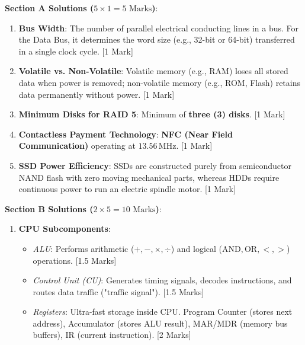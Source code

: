 \begin{solutionbox}
\noindent\textbf{Section A Solutions ($5 \times 1 = 5\text{ Marks}$)}:
\begin{enumerate}
    \item \textbf{Bus Width}: The number of parallel electrical conducting lines in a bus. For the Data Bus, it determines the word size (e.g., 32-bit or 64-bit) transferred in a single clock cycle. [1 Mark]
    \item \textbf{Volatile vs. Non-Volatile}: Volatile memory (e.g., RAM) loses all stored data when power is removed; non-volatile memory (e.g., ROM, Flash) retains data permanently without power. [1 Mark]
    \item \textbf{Minimum Disks for RAID 5}: Minimum of \textbf{three (3) disks}. [1 Mark]
    \item \textbf{Contactless Payment Technology}: \textbf{NFC (Near Field Communication)} operating at $13.56\,\text{MHz}$. [1 Mark]
    \item \textbf{SSD Power Efficiency}: SSDs are constructed purely from semiconductor NAND flash with zero moving mechanical parts, whereas HDDs require continuous power to run an electric spindle motor. [1 Mark]
\end{enumerate}

\medskip
\noindent\textbf{Section B Solutions ($2 \times 5 = 10\text{ Marks}$)}:
\begin{enumerate}[start=6]
    \item \textbf{CPU Subcomponents}:
    \begin{itemize}
        \item \textit{ALU}: Performs arithmetic ($+, -, \times, \div$) and logical ($\text{AND}, \text{OR}, <, >$) operations. [1.5 Marks]
        \item \textit{Control Unit (CU)}: Generates timing signals, decodes instructions, and routes data traffic ("traffic signal"). [1.5 Marks]
        \item \textit{Registers}: Ultra-fast storage inside CPU. Program Counter (stores next address), Accumulator (stores ALU result), MAR/MDR (memory bus buffers), IR (current instruction). [2 Marks]
    \end{itemize}
    

\end{enumerate}
\end{solutionbox}

